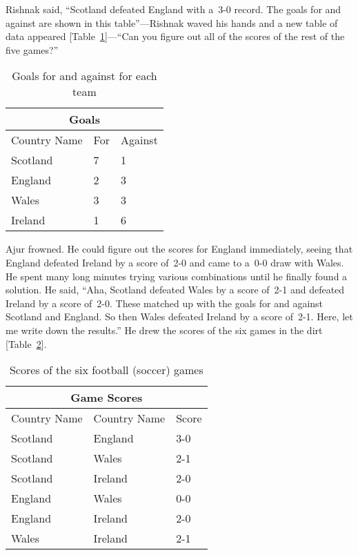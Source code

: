 Rishnak said, ``Scotland defeated England with a~3-0 record. The goals for and against are
shown in this table''---Rishnak waved his hands and a new table of data appeared [Table~\ref{14t2}]---``Can you figure out all of the scores of the rest of the five games?''

\begin{table}
\begin{center}
\begin{tabular}{ |p{3cm}||p{1.5cm}||p{1.5cm} || }
 \hline
 \multicolumn{3}{|c|}{Goals} \\
 \hline
 Country Name & For & Against \\
 \hline
 Scotland & 7 & 1 \\
 England  & 2 & 3 \\
 Wales    & 3 & 3 \\
 Ireland  & 1 & 6 \\
 
 \hline
\end{tabular}
\caption{Goals for and against for each team}\label{14t2}
\end{center}
\end{table}

Ajur frowned. He could figure out the scores for England immediately, seeing that England defeated Ireland by a score of~2-0 and came to a~0-0 draw with Wales. He spent many long minutes trying various combinations until he finally found a solution. He said, ``Aha, Scotland defeated Wales by a score of~2-1 and defeated Ireland by a score of~2-0. These matched up with the goals for and against Scotland and England. So then Wales defeated Ireland by a score of~2-1. Here, let me write down the results.'' He drew the scores of the six games in the dirt [Table~\ref{14t3}].

\begin{table}
\begin{center}
\begin{tabular}{ |p{3cm}||p{3cm}||p{1.5cm} || }
 \hline
 \multicolumn{3}{|c|}{Game Scores} \\
 \hline
 Country Name & Country Name &Score\\
 \hline
 Scotland & England & 3-0 \\
 Scotland & Wales   & 2-1 \\
 Scotland & Ireland & 2-0 \\
 England  & Wales   & 0-0 \\
 England  & Ireland & 2-0 \\
 Wales    & Ireland & 2-1 \\
  \hline
\end{tabular}
\caption{Scores of the six football (soccer) games}\label{14t3}
\end{center}
\end{table}


